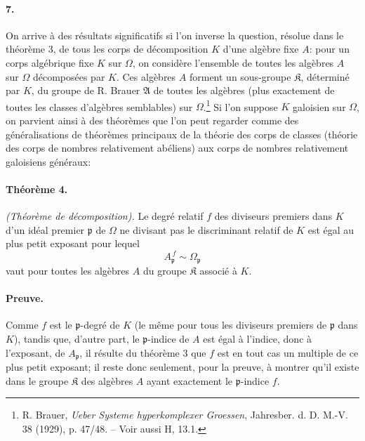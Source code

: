 \paragraph{7.}
On arrive à des résultats significatifs si l'on inverse la question, résolue dans le théorème 3, de tous les corps de décomposition \(K\) d'une algèbre fixe \(A\): pour un corps algébrique fixe \(K\) sur \(\Omega\), on considère l'ensemble de toutes les algèbres \(A\) sur \(\Omega\) décomposées par \(K\). Ces algèbres \(A\) forment un sous-groupe \(\mathfrak K\), déterminé par \(K\), du groupe de R. Brauer \(\mathfrak A\) de toutes les algèbres (plus exactement de toutes les classes d'algèbres semblables) sur \(\Omega\).\footnote{R. Brauer, \emph{Ueber Systeme hyperkomplexer Groessen}, Jahresber. d. D. M.-V. 38 (1929), p. 47/48. -- Voir aussi H, 13.1.} Si l'on suppose \(K\) galoisien sur \(\Omega\), on parvient ainsi à des théorèmes que l'on peut regarder comme des généralisations de théorèmes principaux de la théorie des corps de classes (théorie des corps de nombres relativement abéliens) aux corps de nombres relativement galoisiens généraux:

\paragraph{Théorème 4.}
\emph{(Théorème de décomposition).} Le degré relatif \(f\) des diviseurs premiers dans \(K\) d'un idéal premier \(\mathfrak p\) de \(\Omega\) ne divisant pas le discriminant relatif de \(K\) est égal au plus petit exposant pour lequel
\[
        A_{\mathfrak p}^{\,f}\sim\Omega_{\mathfrak p}
\]
vaut pour toutes les algèbres \(A\) du groupe \(\mathfrak K\) associé à \(K\).

\paragraph{Preuve.}
Comme \(f\) est le \(\mathfrak p\)-degré de \(K\) (le même pour tous les diviseurs premiers de \(\mathfrak p\) dans \(K\)), tandis que, d'autre part, le \(\mathfrak p\)-indice de \(A\) est égal à l'indice, donc à l'exposant, de \(A_{\mathfrak p}\), il résulte du théorème 3 que \(f\) est en tout cas un multiple de ce plus petit exposant; il reste donc seulement, pour la preuve, à montrer qu'il existe dans le groupe \(\mathfrak K\) des algèbres \(A\) ayant exactement le \(\mathfrak p\)-indice \(f\).

